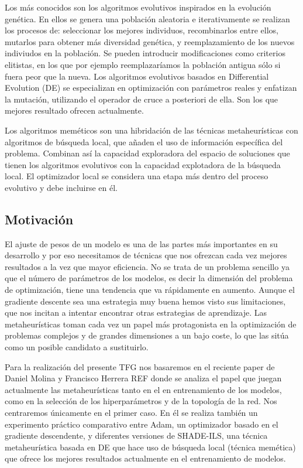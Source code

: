 Los más conocidos son los algoritmos evolutivos inspirados en la evolución genética. En ellos se genera una población aleatoria e iterativamente se realizan los procesos de: seleccionar los mejores individuos, recombinarlos entre ellos, mutarlos para obtener más diversidad genética, y reemplazamiento de los nuevos indiviudos en la población. Se pueden introducir modificaciones como criterios elitistas, en los que por ejemplo reemplazaríamos la población antigua sólo si fuera peor que la nueva. Los algoritmos evolutivos basados en Differential Evolution (DE) se especializan en optimización con parámetros reales y enfatizan la mutación, utilizando el operador de cruce a posteriori de ella. Son los que mejores resultado ofrecen actualmente.

Los algoritmos meméticos son una hibridación de las técnicas metaheurísticas con algoritmos de búsqueda local, que añaden el uso de información específica del problema. Combinan así la capacidad exploradora del espacio de soluciones que tienen los algoritmos evolutivos con la capacidad explotadora de la búsqueda local. El optimizador local se considera una etapa más dentro del proceso evolutivo y debe incluirse en él.



\subsection{Motivación}

El ajuste de pesos de un modelo es una de las partes más importantes en su desarrollo y por eso necesitamos de técnicas que nos ofrezcan cada vez mejores resultados a la vez que mayor eficiencia. No se trata de un problema sencillo ya que el número de parámetros de los modelos, es decir la dimensión del problema de optimización, tiene una tendencia que va rápidamente en aumento. Aunque el gradiente descente sea una estrategia muy buena hemos visto sus limitaciones, que nos incitan a intentar encontrar otras estrategias de aprendizaje. Las metaheurísticas toman cada vez un papel más protagonista en la optimización de problemas complejos y de grandes dimensiones a un bajo coste, lo que las sitúa como un posible candidato a sustituirlo.

Para la realización del presente TFG nos basaremos en el reciente paper de Daniel Molina y Francisco Herrera REF donde se analiza el papel que juegan actualmente las metaheurísticas tanto en el en entrenamiento de los modelos, como en la selección de los hiperparámetros y de la topología de la red. Nos centraremos únicamente en el primer caso. En él se realiza también un experimento práctico comparativo entre Adam, un optimizador basado en el gradiente descendente, y diferentes versiones de SHADE-ILS, una técnica metaheurística basada en DE que hace uso de búsqueda local (técnica memética) que ofrece los mejores resultados actualmente en el entrenamiento de modelos.

